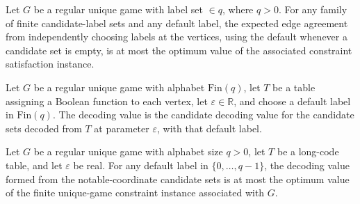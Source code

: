 \begin{theorem}
\label{FABL.RegularUniqueGame.candidateDecodingValue_le_optimum}
\leanok
{}
Let $G$ be a regular unique game with label set $\in q$, where $q>0$. For any family of
finite candidate-label sets and any default label, the expected edge agreement from
independently choosing labels at the vertices, using the default whenever a candidate
set is empty, is at most the optimum value of the associated constraint satisfaction
instance.
\end{theorem}

\begin{definition}
\label{FABL.RegularUniqueGame.decodingValue}
\leanok
{}
Let $G$ be a regular unique game with alphabet $\text{Fin}(q)$, let $T$ be a table
assigning a Boolean function to each vertex, let $\varepsilon\in\mathbb R$, and choose a
default label in $\text{Fin}(q)$. The decoding value is the candidate decoding value for
the candidate sets decoded from $T$ at parameter $\varepsilon$, with that default label.
\end{definition}

\begin{theorem}
\label{FABL.RegularUniqueGame.decodingValue_le_optimum}
\leanok
{}
Let $G$ be a regular unique game with alphabet size $q>0$, let $T$ be a long-code table,
and let $\varepsilon$ be real. For any default label in $\{0,\ldots,q-1\}$, the decoding
value formed from the notable-coordinate candidate sets is at most the optimum value of
the finite unique-game constraint instance associated with $G$.
\end{theorem}

